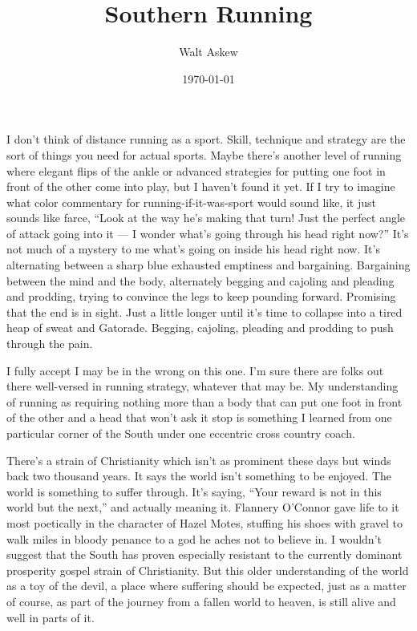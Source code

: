 \documentclass[12pt, oneside]{memoir}
\title{Southern Running}
\author{Walt Askew}
\date{\today}
\begin{document}
\maketitle

I don't think of distance running as a sport.
Skill, technique and strategy are the sort of things you need for
actual sports.
Maybe there's another level of running where elegant flips of the
ankle or advanced strategies for putting one foot in front of the
other come into play, but I haven't found it yet.
If I try to imagine what color commentary for running-if-it-was-sport
would sound like, it just sounds like farce,
``Look at the way he's making that turn! Just the perfect angle of
attack going into it --- I wonder what's going through his head right
now?''
It's not much of a mystery to me what's going on inside his head right
now. 
It's alternating between a sharp blue exhausted emptiness and
bargaining.
Bargaining between the mind and the body, alternately begging and
cajoling and pleading and prodding, trying to convince the legs to
keep pounding forward.
Promising that the end is in sight.
Just a little longer until it's time to collapse into a tired heap of
sweat and Gatorade. 
Begging, cajoling, pleading and prodding to push through the pain.

I fully accept I may be in the wrong on this one.
I'm sure there are folks out there well-versed in running strategy,
whatever that may be.
My understanding of running as requiring nothing more than a body that
can put one foot in front of the other and a head that won't ask it
stop is something I learned from one particular corner of the South
under one eccentric cross country coach.

There's a strain of Christianity which isn't as prominent these days
but winds back two thousand years.
It says the world isn't something to be enjoyed.
The world is something to suffer through.
It's saying, ``Your reward is not in this world but the next,'' and
actually meaning it.
Flannery O'Connor gave life to it most poetically in the character of
Hazel Motes, stuffing his shoes with gravel to walk miles in bloody
penance to a god he aches not to believe in.
I wouldn't suggest that the South has proven especially resistant to the
currently dominant prosperity gospel strain of Christianity.
But this older understanding of the world as a toy of the devil, a
place where suffering should be expected, just as a matter of course,
as part of the journey from a fallen world to heaven, is still alive
and well in parts of it.
\end{document}
